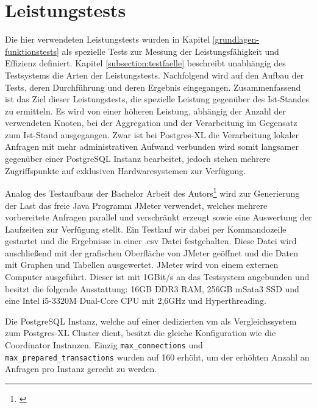\section{Leistungstests}
\label{section:leistungstests}
Die hier verwendeten Leistungstests wurden in Kapitel \ref{grundlagen-funktionstests} als spezielle Tests zur Messung der Leistungsfähigkeit und Effizienz definiert.
Kapitel \ref{subsection:testfaelle} beschreibt unabhängig des Testsystems die Arten der Leistungstests.
Nachfolgend wird auf den Aufbau der Tests, deren Durchführung und deren Ergebnis eingegangen.
Zusammenfassend ist das Ziel dieser Leistungstests, die spezielle Leistung gegenüber des Ist-Standes zu ermitteln.
Es wird von einer höheren Leistung, abhängig der Anzahl der verwendeten Knoten, bei der Aggregation und der Verarbeitung im Gegensatz zum Ist-Stand ausgegangen.
Zwar ist bei Postgres-XL die Verarbeitung lokaler Anfragen mit mehr administrativen Aufwand verbunden  wird somit langsamer gegenüber einer PostgreSQL Instanz bearbeitet, jedoch stehen mehrere Zugriffspunkte auf exklusiven Hardwaresystemen zur Verfügung.

Analog des Testaufbaus der Bachelor Arbeit des Autors\footnote{\cite{ba:kurt}} wird zur Generierung der Last das freie Java Programm JMeter verwendet, welches mehrere vorbereitete Anfragen parallel und verschränkt erzeugt sowie eine Auswertung der Laufzeiten zur Verfügung stellt.
Ein Testlauf wir dabei per Kommandozeile gestartet und die Ergebnisse in einer .csv Datei festgehalten.
Diese Datei wird anschließend mit der grafischen Oberfläche von JMeter geöffnet und die Daten mit Graphen und Tabellen ausgewertet.
JMeter wird von einem externen Computer ausgeführt.
Dieser ist mit 1GBit/s an das Testsystem angebunden und besitzt die folgende Ausstattung:
16GB DDR3 RAM, 256GB mSata3 SSD und eine Intel i5-3320M Dual-Core CPU mit 2,6GHz und Hyperthreading.

Die PostgreSQL Instanz, welche auf einer dedizierten \Gls{vm} als Vergleichssystem zum Postgres-XL Cluster dient, besitzt die gleiche Konfiguration wie die Coordinator Instanzen.
Einzig \verb+max_connections+ und \verb+max_prepared_transactions+ wurden auf 160 erhöht, um der erhöhten Anzahl an Anfragen pro Instanz  gerecht zu werden.

